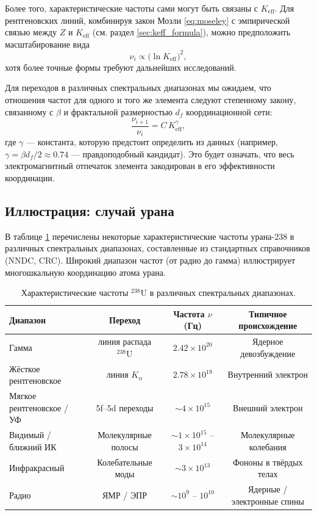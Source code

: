 \documentclass[12pt,a4paper]{article}
\theoremstyle{remark}
\begin{document}
	Более того, характеристические частоты сами могут быть связаны с \(K_{\mathrm{eff}}\). Для рентгеновских линий, комбинируя закон Мозли \eqref{eq:moseley} с эмпирической связью между \(Z\) и \(K_{\mathrm{eff}}\) (см. раздел \ref{sec:keff_formula}), можно предположить масштабирование вида
	\begin{equation}
		\nu_i \propto \bigl(\ln K_{\mathrm{eff}}\bigr)^2,
		\label{eq:freq_scaling}
	\end{equation}
	хотя более точные формы требуют дальнейших исследований.
	
	Для переходов в различных спектральных диапазонах мы ожидаем, что отношения частот для одного и того же элемента следуют степенному закону, связанному с \(\beta\) и фрактальной размерностью \(d_f\) координационной сети:
	\begin{equation}
		\frac{\nu_{i+1}}{\nu_i} = C \, K_{\mathrm{eff}}^{\gamma},
		\label{eq:ratio_scaling}
	\end{equation}
	где \(\gamma\) — константа, которую предстоит определить из данных (например, \(\gamma = \beta d_f/2 \approx 0.74\) — правдоподобный кандидат). Это будет означать, что весь электромагнитный отпечаток элемента закодирован в его эффективности координации.
	
	\subsection{Иллюстрация: случай урана}
	
	В таблице \ref{tab:uranium_spectrum} перечислены некоторые характеристические частоты урана-238 в различных спектральных диапазонах, составленные из стандартных справочников (NNDC, CRC). Широкий диапазон частот (от радио до гамма) иллюстрирует многошкальную координацию атома урана.
	
	\begin{table}[htbp]
		\centering
		\caption{Характеристические частоты \(^{238}\mathrm{U}\) в различных спектральных диапазонах.}
		\label{tab:uranium_spectrum}
		\begin{tabular}{@{}lccc@{}}
			\toprule
			\textbf{Диапазон} & \textbf{Переход} & \textbf{Частота \(\nu\) (Гц)} & \textbf{Типичное происхождение} \\
			\midrule
			Гамма & линия распада \(^{238}\mathrm{U}\) & \(2.42\times10^{20}\) & Ядерное девозбуждение \\
			Жёсткое рентгеновское & линия \(K_\alpha\) & \(2.78\times10^{19}\) & Внутренний электрон \\
			Мягкое рентгеновское / УФ & 5f–5d переходы & \(\sim 4\times10^{15}\) & Внешний электрон \\
			Видимый / ближний ИК & Молекулярные полосы & \(\sim 1\times10^{15}\) – \(3\times10^{14}\) & Молекулярные колебания \\
			Инфракрасный & Колебательные моды & \(\sim 3\times10^{13}\) & Фононы в твёрдых телах \\
			Радио & ЯМР / ЭПР & \(\sim 10^9\) – \(10^{10}\) & Ядерные / электронные спины \\
			\bottomrule
		\end{tabular}
	\end{table}
	
\end{document}
